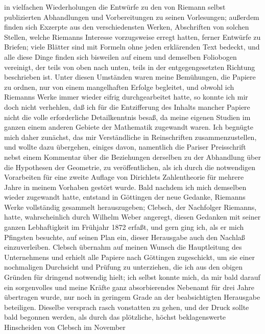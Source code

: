 \documentclass[11pt]{article}
\newcommand{\origpage}[1]{\par\vspace{0.25em}\noindent{\footnotesize\itshape [Gedruckte Seite #1]}\par\vspace{0.25em}}
\begin{document}
\origpage{422}
in vielfachen Wiederholungen die Entwürfe zu den von Riemann selbst publizierten Abhandlungen und Vorbereitungen zu seinen Vorlesungen; außerdem finden sich Exzerpte aus den verschiedensten Werken, Abschriften von solchen Stellen, welche Riemanns Interesse vorzugsweise erregt hatten, ferner Entwürfe zu Briefen; viele Blätter sind mit Formeln ohne jeden erklärenden Text bedeckt, und alle diese Dinge finden sich bisweilen auf einem und demselben Foliobogen vereinigt, der teils von oben nach unten, teils in der entgegengesetzten Richtung beschrieben ist. Unter diesen Umständen waren meine Bemühungen, die Papiere zu ordnen, nur von einem mangelhaften Erfolge begleitet, und obwohl ich Riemanns Werke immer wieder eifrig durchgearbeitet hatte, so konnte ich mir doch nicht verhehlen, daß ich für die Entzifferung des Inhalts mancher Papiere nicht die volle erforderliche Detailkenntnis besaß, da meine eigenen Studien im ganzen einem anderen Gebiete der Mathematik zugewandt waren. Ich begnügte mich daher zunächst, das mir Verständliche in Reinschriften zusammenzustellen, und wollte dazu übergehen, einiges davon, namentlich die Pariser Preisschrift nebst einem Kommentar über die Beziehungen derselben zu der Abhandlung über die Hypothesen der Geometrie, zu veröffentlichen, als ich durch die notwendigen Vorarbeiten für eine zweite Auflage von Dirichlets Zahlentheorie für mehrere Jahre in meinem Vorhaben gestört wurde. Bald nachdem ich mich demselben wieder zugewandt hatte, entstand in Göttingen der neue Gedanke, Riemanns Werke vollständig gesammelt herauszugeben; Clebsch, der Nachfolger Riemanns, hatte, wahrscheinlich durch Wilhelm Weber angeregt, diesen Gedanken mit seiner ganzen Lebhaftigkeit im Frühjahr 1872 erfaßt, und gern ging ich, als er mich Pfingsten besuchte, auf seinen Plan ein, dieser Herausgabe auch den Nachlaß einzuverleiben. Clebsch übernahm auf meinen Wunsch die Hauptleitung des Unternehmens und erhielt alle Papiere nach Göttingen zugeschickt, um sie einer nochmaligen Durchsicht und Prüfung zu unterziehen, die ich aus den obigen Gründen für dringend notwendig hielt; ich selbst konnte mich, da mir bald darauf ein sorgenvolles und meine Kräfte ganz absorbierendes Nebenamt für drei Jahre übertragen wurde, nur noch in geringem Grade an der beabsichtigten Herausgabe beteiligen. Dieselbe versprach rasch vonstatten zu gehen, und der Druck sollte bald begonnen werden, als durch das plötzliche, höchst beklagenswerte Hinscheiden von Clebsch im November
\end{document}

